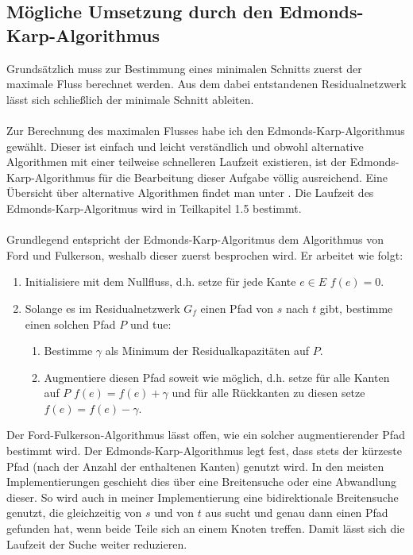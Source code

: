 \documentclass[a4paper, notitlepage, 12pt]{scrartcl}
\begin{document}
 \subsection{Mögliche Umsetzung durch den Edmonds-Karp-Algorithmus}
Grundsätzlich muss zur Bestimmung eines minimalen Schnitts zuerst der maximale Fluss berechnet werden. Aus dem dabei entstandenen Residualnetzwerk lässt sich schließlich der minimale Schnitt ableiten.
\\ \\
Zur Berechnung des maximalen Flusses habe ich den Edmonds-Karp-Algorithmus gewählt. Dieser ist einfach und leicht verständlich und obwohl alternative Algorithmen mit einer teilweise schnelleren Laufzeit existieren, ist der Edmonds-Karp-Algorithmus für die Bearbeitung dieser Aufgabe völlig ausreichend. Eine Übersicht über alternative Algorithmen findet man unter \cite{Src:gft}. Die Laufzeit des Edmonds-Karp-Algoritmus wird in Teilkapitel 1.5 bestimmt.
\\ \\
Grundlegend entspricht der Edmonds-Karp-Algoritmus dem Algorithmus von Ford und Fulkerson, weshalb dieser zuerst besprochen wird. Er arbeitet wie folgt:
\begin{enumerate}
\item Initialisiere mit dem Nullfluss, d.h. setze für jede Kante $e \in E$  $f(e)=0$.
\item Solange es im Residualnetzwerk $G_{f}$ einen Pfad von $s$ nach $t$ gibt, bestimme einen solchen Pfad $P$ und tue:
\begin{enumerate}
\item Bestimme $\gamma$ als Minimum der Residualkapazitäten auf $P$.
\item Augmentiere diesen Pfad soweit wie möglich, d.h. setze für alle Kanten auf $P$  $f(e) = f(e) + \gamma$ und für alle Rückkanten zu diesen setze $f(e) = f(e) - \gamma$.
\end{enumerate}
\end{enumerate}
Der Ford-Fulkerson-Algorithmus lässt offen, wie ein solcher augmentierender Pfad bestimmt wird. Der Edmonds-Karp-Algorithmus legt fest, dass stets der kürzeste Pfad (nach der Anzahl der enthaltenen Kanten) genutzt wird. In den meisten Implementierungen geschieht dies über eine Breitensuche oder eine Abwandlung dieser. So wird auch in meiner Implementierung eine bidirektionale Breitensuche genutzt, die gleichzeitig von $s$ und von $t$ aus sucht und genau dann einen Pfad gefunden hat, wenn beide Teile sich an einem Knoten treffen. Damit lässt sich die Laufzeit der Suche weiter reduzieren.
\end{document}
